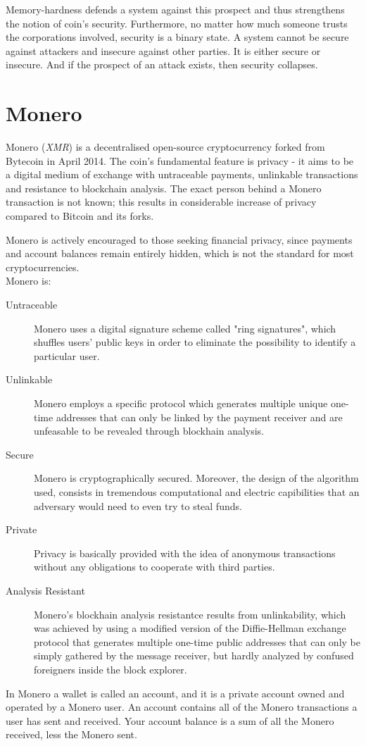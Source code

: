 Memory-hardness defends a system against this prospect and thus strengthens the notion of coin's security. Furthermore, no matter how much someone trusts the corporations involved, security is a binary state. A system cannot be secure against attackers and insecure against other parties. It is either secure or insecure. And if the prospect of an attack exists, then security collapses.
%
\section{Monero}
Monero (\emph{XMR}) is a decentralised open-source cryptocurrency forked from Bytecoin in April 2014. The coin's fundamental feature is privacy - it aims to be a digital medium of exchange with untraceable payments, unlinkable transactions and resistance to blockchain analysis. The exact person behind a Monero transaction is not known; this results in considerable increase of privacy compared to Bitcoin and its forks.~\cite{monerodef}

Monero is actively encouraged to those seeking financial privacy, since payments and account balances remain entirely hidden, which is not the standard for most cryptocurrencies.\\

\noindent Monero is:~\cite{monero}
\begin{description}
  \item [Untraceable] Monero uses a digital signature scheme called "ring signatures", which shuffles users' public keys in order to eliminate the possibility to identify a particular user.
  \item [Unlinkable] Monero employs a specific protocol which generates multiple unique one-time addresses that can only be linked by the payment receiver and are unfeasable to be revealed through blockhain analysis.
  \item [Secure] Monero is cryptographically secured. Moreover, the design of the algorithm used, consists in tremendous computational and electric capibilities that an adversary would need to even try to steal funds.
  \item [Private] Privacy is basically provided with the idea of anonymous transactions without any obligations to cooperate with third parties.
  \item [Analysis Resistant] Monero's blockhain analysis resistantce results from unlinkability, which was achieved by using a modified version of the Diffie-Hellman exchange protocol that generates multiple one-time public addresses that can only be simply gathered by the message receiver, but hardly analyzed by confused foreigners inside the block explorer.
\end{description}
%
In Monero a wallet is called an account, and it is a private account owned and operated by a Monero user. An account contains all of the Monero transactions a user has sent and received. Your account balance is a sum of all the Monero received, less the Monero sent.

